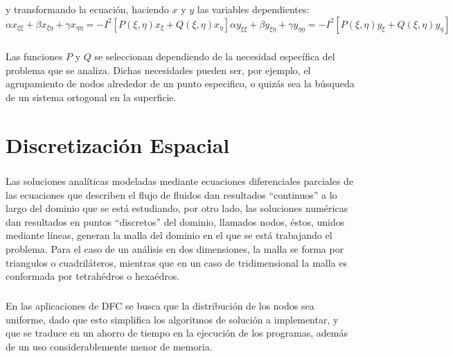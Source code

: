 \documentclass[letterpaper, openright, 12pt]{book}
\begin{document}
					y transformando la ecuación, haciendo $x$ y $y$  las variables dependientes:
					\begin{subequations}
						\begin{equation}
							\alpha x_{\xi \xi} + \beta x_{\xi \eta} + \gamma x_{\eta \eta} = -I^2 [P(\xi, \eta) x_{\xi} + Q(\xi, \eta) x_{\eta}]
						\end{equation}
						\begin{equation}
						\alpha y_{\xi \xi} + \beta y_{\xi \eta} + \gamma y_{\eta \eta} = -I^2 [P(\xi, \eta) y_{\xi} + Q(\xi, \eta) y_{\eta}]
						\end{equation}
						\label{ec-poisson-invertida}
					\end{subequations}
			
				\paragraph*{}
					Las funciones $P$ y $Q$ se seleccionan dependiendo de la necesidad específica del problema que se analiza. Dichas necesidades pueden ser, por ejemplo, el agrupamiento de nodos alrededor de un punto especifico, o quizás sea la búsqueda de un sistema ortogonal en la superficie.
	
	\chapter{Discretización Espacial} \label{chap:discretizacion-espacial}
	\paragraph*{}
	Las soluciones analíticas modeladas mediante ecuaciones diferenciales parciales de las ecuaciones que describen el flujo de fluidos dan resultados ``continuos'' a lo largo del dominio que se está estudiando, por otro lado, las soluciones numéricas  dan resultados en puntos ``discretos'' del dominio, llamados nodos, éstos, unidos mediante líneas, generan la malla del dominio en el que se está trabajando el problema. Para el caso de un análisis en dos dimensiones, la malla se forma por triangulos o cuadriláteros, mientras que en un caso de tridimensional la malla es conformada por tetrahédros o hexaédros. 
	
	\paragraph*{}
	En las aplicaciones de DFC se busca que la distribución de los nodos sea uniforme, dado que esto simplifica los algoritmos de solución a implementar,  y que se traduce en un ahorro de tiempo en la ejecución de los programas, además de un uso considerablemente menor de memoria.
	
\end{document}
